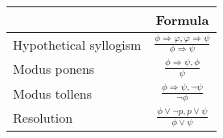 \begin{tabular}{|lc|}
\hline
\rowcolor[HTML]{3166FF} 
\multicolumn{1}{|l|}{\cellcolor[HTML]{3166FF}Rule} & Formula \\ \hline
\rowcolor[HTML]{9AFF99} 
Hypothetical syllogism & $\frac{\phi \Longrightarrow \varphi, \varphi \Longrightarrow \psi}{\phi \Longrightarrow \psi}$  \\
\rowcolor[HTML]{9AFF99} 
Modus ponens & $\frac{\phi \Longrightarrow \psi, \phi}{\psi}$ \\
\rowcolor[HTML]{9AFF99} 
Modus tollens & $\frac{\phi \Longrightarrow \psi, \neg\psi}{\neg\phi}$ \\
\rowcolor[HTML]{9AFF99} 
Resolution & $\frac{\phi \lor \neg p, p \lor \psi}{\phi \lor \psi}$ \\ \hline
\end{tabular}